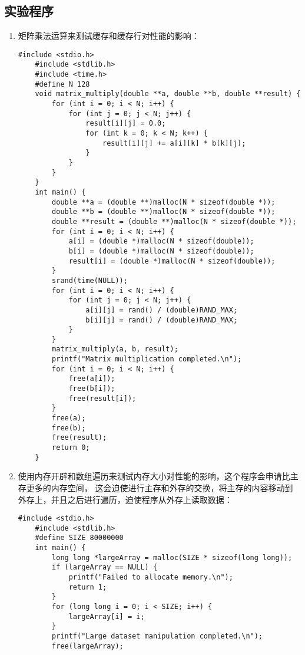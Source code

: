 \documentclass{article}
\begin{document}
\subsection{实验程序}
\begin{enumerate}
  \item 矩阵乘法运算来测试缓存和缓存行对性能的影响：
  \begin{lstlisting}[style=cstyle]
    #include <stdio.h>
    #include <stdlib.h>
    #include <time.h>
    #define N 128
    void matrix_multiply(double **a, double **b, double **result) {
        for (int i = 0; i < N; i++) {
            for (int j = 0; j < N; j++) {
                result[i][j] = 0.0;
                for (int k = 0; k < N; k++) {
                    result[i][j] += a[i][k] * b[k][j];
                }
            }
        }
    }
    int main() {
        double **a = (double **)malloc(N * sizeof(double *));
        double **b = (double **)malloc(N * sizeof(double *));
        double **result = (double **)malloc(N * sizeof(double *));
        for (int i = 0; i < N; i++) {
            a[i] = (double *)malloc(N * sizeof(double));
            b[i] = (double *)malloc(N * sizeof(double));
            result[i] = (double *)malloc(N * sizeof(double));
        }
        srand(time(NULL));
        for (int i = 0; i < N; i++) {
            for (int j = 0; j < N; j++) {
                a[i][j] = rand() / (double)RAND_MAX;
                b[i][j] = rand() / (double)RAND_MAX;
            }
        }
        matrix_multiply(a, b, result);
        printf("Matrix multiplication completed.\n");
        for (int i = 0; i < N; i++) {
            free(a[i]);
            free(b[i]);
            free(result[i]);
        }
        free(a);
        free(b);
        free(result);
        return 0;
    }
  \end{lstlisting}
  \item 使用内存开辟和数组遍历来测试内存大小对性能的影响，这个程序会申请比主存更多的内存空间，
  这会迫使进行主存和外存的交换，将主存的内容移动到外存上，并且之后进行遍历，迫使程序从外存上读取数据：
  \begin{lstlisting}[style=cstyle]
    #include <stdio.h>
    #include <stdlib.h>
    #define SIZE 80000000
    int main() {
        long long *largeArray = malloc(SIZE * sizeof(long long));
        if (largeArray == NULL) {
            printf("Failed to allocate memory.\n");
            return 1;
        }
        for (long long i = 0; i < SIZE; i++) {
            largeArray[i] = i;
        }
        printf("Large dataset manipulation completed.\n");
        free(largeArray);

\end{lstlisting}
\end{enumerate}
\end{document}
